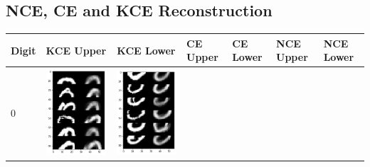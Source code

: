 \documentclass[12pt]{report} %
\begin{document}
\subsection{NCE, CE and KCE Reconstruction}
\begin{tabular}{m{0.7cm}m{2.4cm}m{2.4cm}m{2.4cm}m{2.4cm}m{2.4cm}m{2.4cm}}
\toprule
Digit & KCE Upper & KCE Lower & CE Upper & CE Lower & NCE Upper & NCE Lower\\
\midrule
0 & \includegraphics[scale=0.3]{pictures/KE_0_up.png} & \includegraphics[scale=0.3]{pictures/KE_0_down.png} &

\end{tabular}
\end{document}

